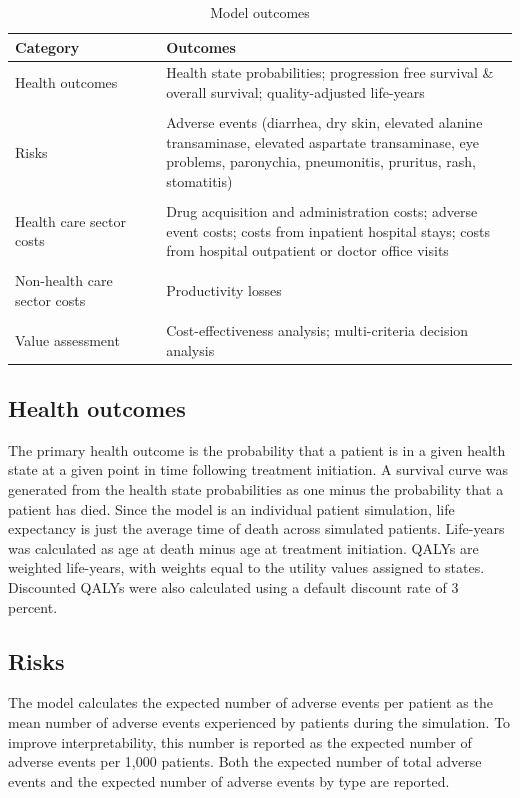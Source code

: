 \documentclass[11pt,final,fleqn]{article}\usepackage[]{graphicx}\usepackage[]{color}
\theoremstyle{plain}
\begin{document}
{\begin{table}[!ht]
\begin{center}
\begin{threeparttable}
\caption{Model outcomes} \label{tbl:model-outcomes}
\begin{tabular}{p{0.3\linewidth}p{0.7\linewidth}}
\hline
\multicolumn{1}{l}{Category} & \multicolumn{1}{l}{Outcomes}\\
\hline
Health outcomes & Health state probabilities; progression free survival \& overall survival; quality-adjusted life-years\\
&\\
Risks & Adverse events (diarrhea, dry skin, elevated alanine transaminase, elevated aspartate transaminase, eye problems, paronychia, pneumonitis, pruritus, rash, stomatitis)\\
&\\
Health care sector costs & Drug acquisition and administration costs; adverse event costs; costs from inpatient hospital stays; costs from hospital outpatient or doctor office visits\\
&\\
Non-health care sector costs & Productivity losses \\
&\\
Value assessment & Cost-effectiveness analysis; multi-criteria decision analysis\\
\hline
\end{tabular}
\scriptsize
\end{threeparttable}
\end{center}
\end{table}

\subsection{Health outcomes}
The primary health outcome is the probability that a patient is in a given health state at a given point in time following treatment initiation. A survival curve was generated from the health state probabilities as one minus the probability that a patient has died. Since the model is an individual patient simulation, life expectancy is just the average time of death across simulated patients. Life-years was calculated as age at death minus age at treatment initiation. QALYs are weighted life-years, with weights equal to the utility values assigned to states.  Discounted QALYs were also calculated using a default discount rate of 3 percent.

\subsection{Risks}
The model calculates the expected number of adverse events per patient as the mean number of adverse events experienced by patients during the simulation. To improve interpretability, this number is reported as the expected number of adverse events per 1,000 patients. Both the expected number of total adverse events and the expected number of adverse events by type are reported.

}
\end{document}
